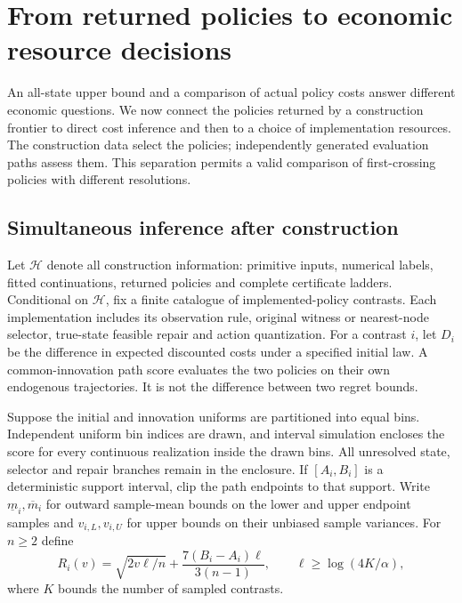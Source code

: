 \section{From returned policies to economic resource decisions}\label{sec:decisions49}
An all-state upper bound and a comparison of actual policy costs answer different economic questions. We now connect the policies returned by a construction frontier to direct cost inference and then to a choice of implementation resources. The construction data select the policies; independently generated evaluation paths assess them. This separation permits a valid comparison of first-crossing policies with different resolutions.

\subsection{Simultaneous inference after construction}
Let $\mathcal H$ denote all construction information: primitive inputs, numerical labels, fitted continuations, returned policies and complete certificate ladders. Conditional on $\mathcal H$, fix a finite catalogue of implemented-policy contrasts. Each implementation includes its observation rule, original witness or nearest-node selector, true-state feasible repair and action quantization. For a contrast $i$, let $D_i$ be the difference in expected discounted costs under a specified initial law. A common-innovation path score evaluates the two policies on their own endogenous trajectories. It is not the difference between two regret bounds.

Suppose the initial and innovation uniforms are partitioned into equal bins. Independent uniform bin indices are drawn, and interval simulation encloses the score for every continuous realization inside the drawn bins. All unresolved state, selector and repair branches remain in the enclosure. If $[A_i,B_i]$ is a deterministic support interval, clip the path endpoints to that support. Write $\underline m_i,\overline m_i$ for outward sample-mean bounds on the lower and upper endpoint samples and $v_{i,L},v_{i,U}$ for upper bounds on their unbiased sample variances. For $n\ge2$ define
\begin{equation}\label{eq:radius49}
 R_i(v)=\sqrt{2v\ell/n}+\frac{7(B_i-A_i)\ell}{3(n-1)},
 \qquad \ell\ge\log(4K/\alpha),
\end{equation}
where $K$ bounds the number of sampled contrasts.

